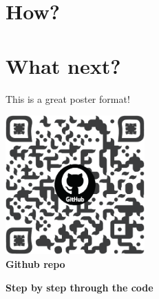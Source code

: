 \documentclass[a0paper,fleqn]{betterposter}
\begin{document}
{%

\section{How?}


\section{What next?}
This is a great poster format!

\vfill
\begin{center}
\includegraphics[width=0.4\textwidth]{img/qr_code}\\
{\selectfont\textbf{Github repo}}
\end{center}

}{
{\selectfont\textbf{Step by step through the code}}\\

}
\end{document}
